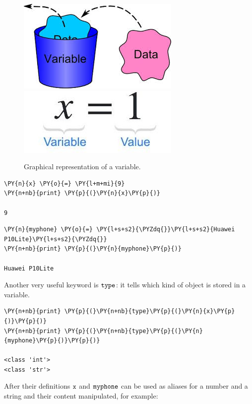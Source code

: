 \begin{figure}[h]
\centering
\includegraphics[width=0.35\linewidth]{figures/var1.jpeg}\\
\includegraphics[width=0.35\linewidth]{figures/var2.jpeg}
\caption{Graphical representation of a variable.}
\end{figure}

\begin{codebox}
\begin{Verbatim}[commandchars=\\\{\}]
\PY{n}{x} \PY{o}{=} \PY{l+m+mi}{9}
\PY{n+nb}{print} \PY{p}{(}\PY{n}{x}\PY{p}{)}

9
\end{Verbatim}
\end{codebox}

\begin{codebox}
\begin{Verbatim}[commandchars=\\\{\}]
\PY{n}{myphone} \PY{o}{=} \PY{l+s+s2}{\PYZdq{}}\PY{l+s+s2}{Huawei P10Lite}\PY{l+s+s2}{\PYZdq{}}
\PY{n+nb}{print} \PY{p}{(}\PY{n}{myphone}\PY{p}{)}

Huawei P10Lite
\end{Verbatim}
\end{codebox}

Another very useful keyword is \(\tt{type}\): it tells which kind of object is stored in a variable.

\begin{codebox}
\begin{Verbatim}[commandchars=\\\{\}]
\PY{n+nb}{print} \PY{p}{(}\PY{n+nb}{type}\PY{p}{(}\PY{n}{x}\PY{p}{)}\PY{p}{)}
\PY{n+nb}{print} \PY{p}{(}\PY{n+nb}{type}\PY{p}{(}\PY{n}{myphone}\PY{p}{)}\PY{p}{)}

<class 'int'>
<class 'str'>
\end{Verbatim}
\end{codebox}

After their definitions \(\tt{x}\) and \(\tt{myphone}\) can be used as aliases for a number and a string and their content manipulated, for example:

